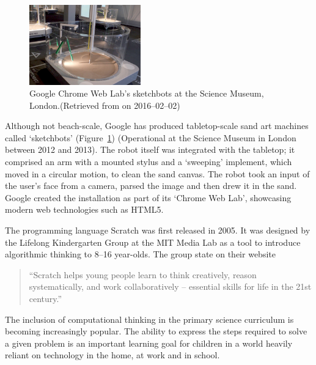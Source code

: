         \begin{figure}
          \begin{center}
            \includegraphics[width=0.43\textwidth]{Files/sketchbots}
          \end{center}
          \caption{Google Chrome Web Lab's sketchbots at the Science Museum, London.{\small (Retrieved from  on 2016--02--02)}}
          \label{fig: sketchbots}
        \end{figure}
        Although not beach-scale, Google has produced tabletop-scale sand art machines called `sketchbots' (Figure~\ref{fig: sketchbots}) (Operational at the Science Museum in London between 2012 and 2013).\cite{Warman2012} The robot itself was integrated with the tabletop; it comprised an arm with a mounted stylus and a `sweeping' implement, which moved in a circular motion, to clean the sand canvas. The robot took an input of the user's face from a camera, parsed the image and then drew it in the sand. Google  created the installation as part of its `Chrome Web Lab', showcasing modern web technologies such as HTML5.


\label{education review}
    The programming language Scratch was first released in 2005. It was designed by the Lifelong Kindergarten Group at the MIT Media Lab as a tool to introduce algorithmic thinking to 8--16 year-olds.\cite{scratch} The group state on their website
    \begin{quotation}
        ``Scratch helps young people learn to think creatively, reason systematically, and work collaboratively -- essential skills for life in the 21st century.''
    \end{quotation}
    The inclusion of computational thinking in the primary science curriculum is becoming increasingly popular. The ability to express the steps required to solve a given problem is an important learning goal for children in a world heavily reliant on technology in the home, at work and in school.

